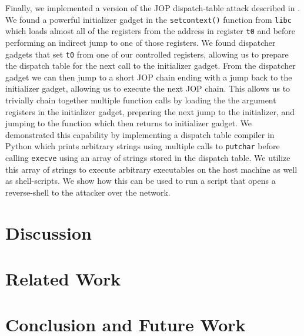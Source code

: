 Finally, we implemented a version of the JOP dispatch-table attack described in
\cite{bletsch11jopx86}. We found a powerful initializer gadget in the \verb|setcontext()|
function from \verb|libc| which loads almost all of the registers from the address
in register \verb|t0| and before performing an indirect jump to one of those registers.
We found dispatcher gadgets that set \verb|t0| from one of our controlled registers, 
allowing us to prepare the dispatch table for the next call to the initializer gadget.
From the dispatcher gadget we can then jump to a short JOP chain ending with a jump back to 
the initializer gadget, allowing us to execute the next JOP chain.
This allows us to trivially chain together multiple function calls by loading the
the argument registers in the initializer gadget, preparing the next jump to the initializer,
and jumping to the function which then returns to initializer gadget. We demonstrated this
capability by implementing a dispatch table compiler in Python which prints arbitrary strings
using multiple calls to \verb|putchar| before calling \verb|execve| using an array of strings
stored in the dispatch table. We utilize this array of strings to execute arbitrary
executables on the host machine as well as shell-scripts. We show how this can be used to run 
a script that opens a reverse-shell to the attacker over the network.


\section{Discussion}

\section{Related Work}

\section{Conclusion and Future Work}

